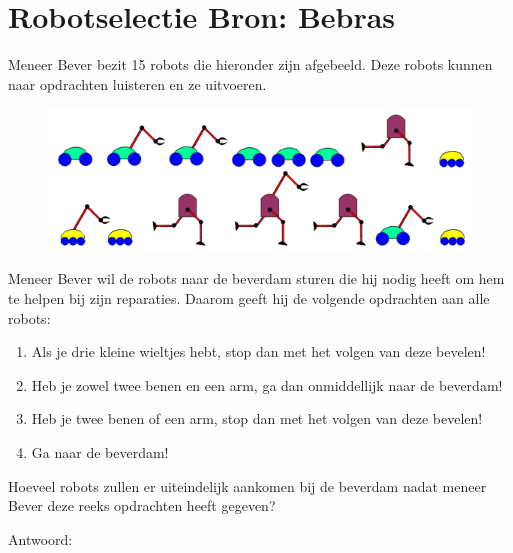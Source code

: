 \documentclass[12pt, a4paper]{article}
\begin{document}
	\begin{minipage}{\textwidth}
		\section{Robotselectie \hfill\small Bron: Bebras}
			
			Meneer Bever bezit 15 robots die hieronder zijn afgebeeld. Deze robots kunnen naar opdrachten luisteren en ze uitvoeren.
			
			\begin{figure}[H]
				\includegraphics[width=\linewidth]{image1}
			\end{figure}
			
			Meneer Bever wil de robots naar de beverdam sturen die hij nodig heeft om hem te helpen bij zijn reparaties. Daarom geeft hij de volgende opdrachten aan alle robots:
			
			\begin{enumerate}
				\item Als je drie kleine wieltjes hebt, stop dan met het volgen van deze bevelen!
				\item Heb je zowel twee benen en een arm, ga dan onmiddellijk naar de beverdam!
				\item Heb je twee benen of een arm, stop dan met het volgen van deze bevelen!
				\item Ga naar de beverdam!
			\end{enumerate}
			
			Hoeveel robots zullen er uiteindelijk aankomen bij de beverdam nadat meneer Bever deze reeks opdrachten heeft gegeven?
			
			\begin{center}
				Antwoord: \raisebox{-0.2cm}{\rule{5cm}{0.4pt}}
			\end{center}


	\end{minipage} \\ \\ 
		
\end{document}
